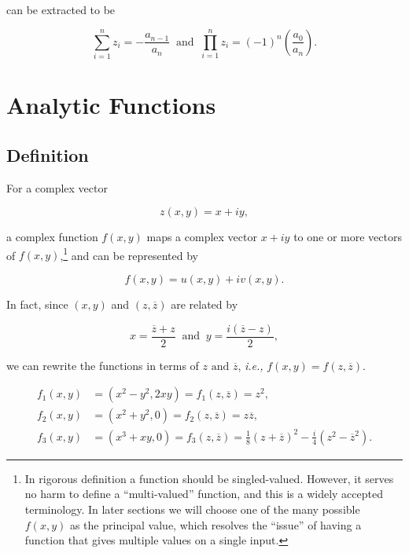 \documentclass[english,a4paper,12pt]{report}
\begin{document}
can be extracted to be 

\begin{equation}
    \sum_{i=1}^{n} z_{i} = - \frac{a_{n-1} }{a_{n} } ~\text { and }~ \prod_{i=1}^{n} z_{i} = (-1)^{n} \left(\frac{a_{0} }{a_{n} }\right).     
\end{equation}

\section{Analytic Functions}

\subsection{Definition}

For a complex vector 

\begin{equation}
    z(x,y) = x+iy,
\end{equation}

a complex function \(f(x,y)\) maps a complex vector \(x+iy\) to one or more vectors of \(f(x,y)\),\footnote{In rigorous definition a function should be singled-valued. However, it serves no harm to define a ``multi-valued'' function, and this is a widely accepted terminology. In later sections we will choose one of the many possible \(f(x,y)\) as the principal value, which resolves the ``issue'' of having a function that gives multiple values on a single input.}  and can be represented by

\begin{equation}
    f(x,y) = u(x,y) + iv(x,y).
\end{equation}

In fact, since \((x,y)\) and \((z,\overline{z} )\) are related by 

\begin{equation}
    x = \frac{\overline{z} +z }{2} ~\text { and }~ y = \frac{i(\overline{z} -z)}{2},
\end{equation}

we can rewrite the functions in terms of \(z \text { and } \overline{z} \), \textit{i.e.,} \(f(x,y) = f(z, \overline{z} )\). 

\begin{equation}
    \begin{aligned} 
    f_1 (x,y) &= (x^2-y^2,2xy) = f_1 (z,\overline{z} ) = z^2,\\
    f_2 (x,y) &= (x^2+y^2,0) = f_2 (z,\overline{z} ) = z \overline{z} ,\\
    f_3 (x,y) &= (x^3 +xy,0) = f_3 (z,\overline{z} ) = \frac{1}{8} (z + \overline{z} )^2 - \frac{i}{4}(z^2-\overline{z} ^2). 
    \end{aligned} 
\end{equation}
\end{document}
